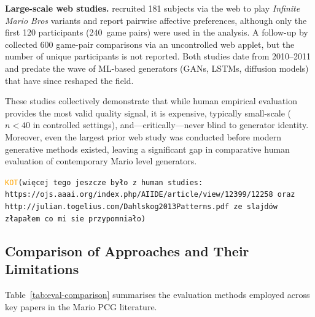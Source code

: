 \documentclass[shortabstract, mgr, english]{iithesis}
\newcommand{\DEBUG}[1]{{#1}} %
\newcommand{\KOT}[1]{\DEBUG{\tt{\textcolor{orange}{KOT}(}{#1}{)}}}
\begin{document}
\textbf{Large-scale web studies.} \citet{pedersen2010modeling} recruited 181
subjects via the web to play \emph{Infinite Mario Bros} variants and report
pairwise affective preferences, although only the first 120 participants
(240~game pairs) were used in the analysis.
A follow-up by \citet{shaker2011features} collected 600
game-pair comparisons via an uncontrolled web applet, but the number of unique
participants is not reported.
Both studies date from 2010--2011 and predate the wave of ML-based generators
(GANs, LSTMs, diffusion models) that have since reshaped the field.

These studies collectively demonstrate that while human empirical evaluation provides the
most valid quality signal, it is expensive, typically small-scale ($n < 40$ in
controlled settings), and---critically---never blind to generator identity.
Moreover, even the largest prior web study was conducted before modern
generative methods existed, leaving a significant gap in comparative human
evaluation of contemporary Mario level generators.

\KOT{więcej tego jeszcze było z human studies: https://ojs.aaai.org/index.php/AIIDE/article/view/12399/12258 oraz http://julian.togelius.com/Dahlskog2013Patterns.pdf  ze slajdów złapałem co mi sie przypomniało}

\subsection{Comparison of Approaches and Their Limitations}
\label{subsec:bg-eval-comparison}

Table~\ref{tab:eval-comparison} summarises the evaluation methods employed across
key papers in the Mario PCG literature.
\end{document}
